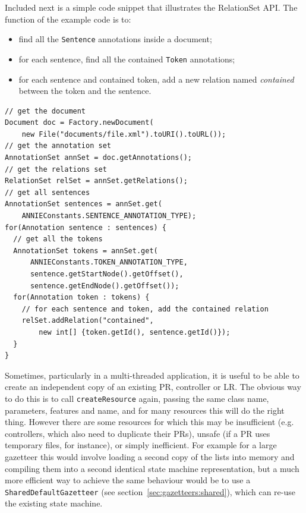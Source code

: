 Included next is a simple code snippet that illustrates the RelationSet API.
The function of the example code is to:
\begin{itemize}
  \item find all the {\tt Sentence} annotations inside a document;
  \item for each sentence, find all the contained {\tt Token} annotations;
  \item for each sentence and contained token, add a new relation named {\em
  contained} between the token and the sentence. 
\end{itemize}

\begin{lstlisting}
// get the document
Document doc = Factory.newDocument(
    new File("documents/file.xml").toURI().toURL());
// get the annotation set
AnnotationSet annSet = doc.getAnnotations();
// get the relations set
RelationSet relSet = annSet.getRelations();
// get all sentences
AnnotationSet sentences = annSet.get(
    ANNIEConstants.SENTENCE_ANNOTATION_TYPE);
for(Annotation sentence : sentences) {
  // get all the tokens
  AnnotationSet tokens = annSet.get(
      ANNIEConstants.TOKEN_ANNOTATION_TYPE,
      sentence.getStartNode().getOffset(),
      sentence.getEndNode().getOffset());
  for(Annotation token : tokens) {
    // for each sentence and token, add the contained relation
    relSet.addRelation("contained", 
        new int[] {token.getId(), sentence.getId()});
  }
}
\end{lstlisting}


Sometimes, particularly in a multi-threaded application, it is useful to be
able to create an independent copy of an existing PR, controller or LR.  The
obvious way to do this is to call {\tt createResource} again, passing the same
class name, parameters, features and name, and for many resources this will do
the right thing.  However there are some resources for which this may be
insufficient (e.g. controllers, which also need to duplicate their PRs), unsafe
(if a PR uses temporary files, for instance), or simply inefficient.  For
example for a large gazetteer this would involve loading a second copy of the
lists into memory and compiling them into a second identical state machine
representation, but a much more efficient way to achieve the same behaviour
would be to use a {\tt SharedDefaultGazetteer} (see
section~\ref{sec:gazetteers:shared}), which can re-use the existing state
machine.

